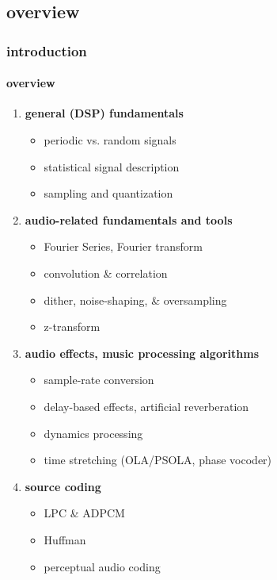 \subsection{overview}
\begin{frame}\frametitle{introduction}\framesubtitle{overview}
    \begin{enumerate}
        \item   \textbf{general (DSP) fundamentals}
            \begin{itemize}
                \item   periodic vs. random signals
                \item   statistical signal description
                \item   sampling and quantization
            \end{itemize}
        \pause
        \item   \textbf{audio-related fundamentals and tools}
            \begin{itemize}
                \item   Fourier Series, Fourier transform
                \item   convolution \& correlation
                \item   dither, noise-shaping,  \& oversampling
                \item   z-transform
            \end{itemize}
        \pause
        \item   \textbf{audio effects, music processing algorithms}
            \begin{itemize}
                \item   sample-rate conversion
                \item   delay-based effects, artificial reverberation
                \item   dynamics processing
                \item   time stretching (OLA/PSOLA, phase vocoder)
            \end{itemize}
        \pause
        \item   \textbf{source coding}
            \begin{itemize}
                \item   LPC \& ADPCM
                \item   Huffman 
                \item   perceptual audio coding
            \end{itemize}
    \end{enumerate}
\end{frame}

